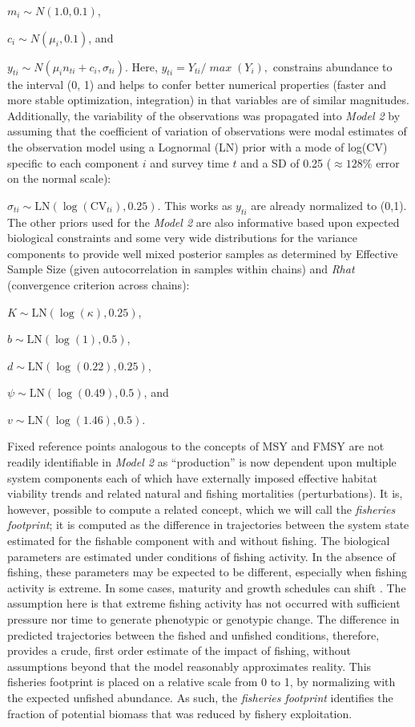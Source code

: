 \documentclass[
	letterpaper, %
	10pt, %
]{article}
\begin{document}
$m_i \sim N(1.0, 0.1)$,

$c_i \sim N(\mu_i, 0.1)$, and

$y_{\mathit{ti}} \sim N(\mu_i n_{\mathit{ti}} + c_i, \sigma_{ti})$.
Here, ${y_{\mathit{ti}}={Y_{\mathit{ti}}/\mathit{\max}}}{(Y_{i})},$ 
constrains abundance to the interval (0, 1) and helps to confer better
numerical properties (faster and more stable optimization, integration)
in that variables are of similar magnitudes. Additionally, the variability of the observations was propagated into
\emph{Model 2} by assuming that the coefficient of variation of observations
were modal estimates of the observation model using a Lognormal (LN)
prior with a mode of log(CV) specific to each component $i$ and survey
time $t$ and a SD of 0.25 ($\approx 128\%$ error on the normal scale):

$\sigma_{ti} \sim \mathrm{LN}(\log(\mathrm{CV}_{ti}), 0.25)$. 
This works as $y_{\mathit{ti}}$ are already normalized to (0,1). 
The other priors used for the \emph{Model 2} are also informative based upon
expected biological constraints and some very wide distributions for
the variance components to provide well mixed posterior samples as
determined by Effective Sample Size (given autocorrelation in samples
within chains) and \emph{Rhat} (convergence criterion across chains):

$K\sim\mathrm{LN}\left(\log(\kappa),0.25 \right)$,

$b\sim\mathrm{LN}\left(\log(1),0.5 \right)$,

$d\sim\mathrm{LN}\left(\log(0.22),0.25 \right)$,

$\psi\sim\mathrm{LN}\left(\log(0.49),0.5 \right)$, and

${v\sim\mathrm{LN}\left(\log(1.46),0.5 \right)}.$ 

Fixed reference points analogous to the concepts of MSY and FMSY are
not readily identifiable in \emph{Model 2} as ``production'' is now dependent
upon multiple system components each of which have externally imposed
effective habitat viability trends and related natural and fishing
mortalities (perturbations). It is, however, possible to compute a
related concept, which we will call the \emph{fisheries footprint};
it is computed as the difference in trajectories between the system
state estimated for the fishable component with and without fishing.
The biological parameters are estimated under conditions of fishing
activity. In the absence of fishing, these parameters may be expected
to be different, especially when fishing activity is extreme. In some
cases, maturity and growth schedules can shift \cite{Zwanenburg_et_al_2002, Choi_et_al_2004, Choi_et_al_2005a}. The assumption here is that extreme fishing activity has not occurred
with sufficient pressure nor time to generate phenotypic or genotypic
change. The difference in predicted trajectories between the fished
and unfished conditions, therefore, provides a crude, first order
estimate of the impact of fishing, without assumptions beyond that
the model reasonably approximates reality. This fisheries footprint is
placed on a relative scale from 0 to 1, by normalizing with the expected
unfished abundance. As such, the \emph{fisheries footprint} identifies
the fraction of potential biomass that was reduced by fishery exploitation.
\end{document}

